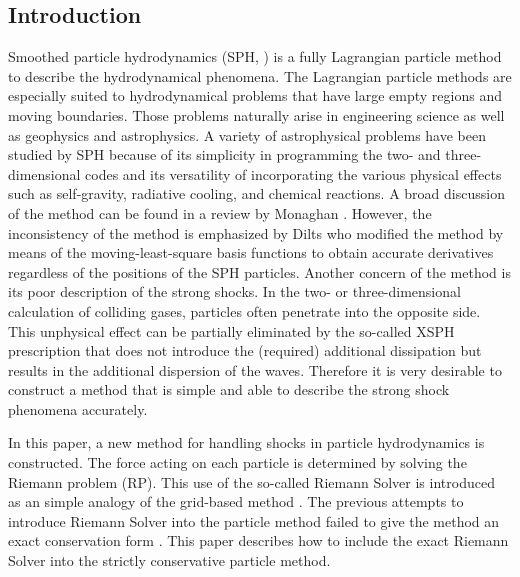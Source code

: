 \documentclass{cjour}
\begin{document}
\begin{article}






\section{Introduction}

Smoothed particle hydrodynamics (SPH, \cite{Lucy:SPH,GM:SPH}) 
is a fully Lagrangian particle method 
to describe the hydrodynamical phenomena.  
The Lagrangian particle methods are especially 
suited to hydrodynamical problems 
that have large empty regions and moving boundaries.    
Those problems naturally arise in engineering science 
as well as geophysics and astrophysics.  
A variety of astrophysical problems have been studied by SPH 
because of its simplicity in programming the two- and 
three-dimensional codes and its versatility of incorporating 
the various physical effects such as self-gravity, radiative cooling, 
and chemical reactions.   
A broad discussion of the method can be found 
in a review by Monaghan \cite{Monaghan:ARAA}.  
However, the inconsistency of the method is emphasized by Dilts
\cite{Dilts:1999,Dilts:2000} who modified the method by means of 
the moving-least-square basis functions to obtain accurate 
derivatives regardless of the positions of the SPH particles.      
Another concern of the method is its poor description 
of the strong shocks.  
In the two- or three-dimensional calculation of colliding gases, 
particles often penetrate into the opposite side.  
This unphysical effect can be partially eliminated by the so-called 
XSPH prescription \cite{Monaghan:1989} 
that does not introduce the (required) additional dissipation 
but results in the additional dispersion of the waves.  
Therefore it is very desirable to construct a method 
that is simple and able to describe the strong shock 
phenomena accurately.  

In this paper, a new method for handling shocks in 
particle hydrodynamics is constructed.  
The force acting on each particle is determined by solving 
the Riemann problem (RP). 
This use of the so-called Riemann Solver is 
introduced as an simple analogy of the grid-based method 
\cite{Godunov:1959}.  
The previous attempts to introduce Riemann Solver into the particle 
method failed to give the method an exact conservation form
\cite{SI:GPH,SI:IAU95}. 
This paper describes how to include the exact Riemann Solver into 
the strictly conservative particle method. 


\end{article}
\end{document}
